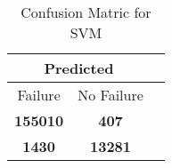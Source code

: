 \begin{table}[] 
\caption{Confusion Matric for SVM} 
\label{Table: Prediction Accuracy-NoneSVM99.0EKF-ignoreReflection-Reflection} 
\centering 
\begin{tabular} 
 {@{}ccc@{}} 
\toprule 
\multicolumn{2}{c}{\textbf{Predicted}}
 \\ \midrule 
\multicolumn{1}{|c|}{Failure} & 
\multicolumn{1}{c|}{No Failure}
 \\ \midrule 
\multicolumn{1}{|c|}{\color{green}\textbf{155010}} & 
\multicolumn{1}{c|}{\color{red}\textbf{407}}
 \\ \midrule 
\multicolumn{1}{|c|}{\color{red}\textbf{1430}} & 
\multicolumn{1}{c|}{\color{green}\textbf{13281}}
 \\ \bottomrule 
\end{tabular} 
\end{table} 
